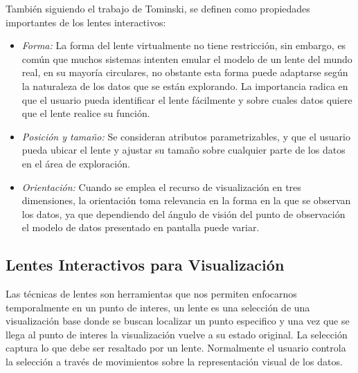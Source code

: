 \documentclass[journal]{IEEEtran}
\begin{document}
 También siguiendo el trabajo de Tominski, se definen como propiedades importantes de los lentes interactivos:
 \begin{itemize}
   \item  \emph{Forma:} La forma del lente virtualmente no tiene restricción, sin embargo, es común que muchos sistemas intenten
   emular el modelo de un lente del mundo real, en su mayoría circulares, no obstante esta forma puede adaptarse según la naturaleza de los datos
   que se están explorando. La importancia radica en que el usuario pueda identificar el lente fácilmente y sobre cuales datos quiere que el lente
   realice su función.
   \item \emph{Posición y tamaño:} Se consideran atributos parametrizables, y que el usuario pueda ubicar el lente y ajustar su tamaño sobre
   cualquier parte de los datos en el área de exploración.
   \item \emph{Orientación:} Cuando se emplea el recurso de visualización en tres dimensiones, la orientación toma relevancia en la forma en la que 
   se observan los datos, ya que dependiendo del ángulo de visión del punto de observación el modelo de datos presentado en pantalla puede variar.
 \end{itemize}

 \subsection{Lentes Interactivos para Visualización}
 Las técnicas de lentes son herramientas que nos permiten enfocarnos temporalmente en un punto de interes, un lente es una selección 
 de una visualización base donde se buscan localizar un punto especifico y una vez que se llega al punto de interes
 la visualización vuelve a su estado original. La selección captura lo que debe ser resaltado por un lente. 
 Normalmente el usuario controla la selección a través de movimientos sobre la representación visual de los datos. 
 
\end{document}
